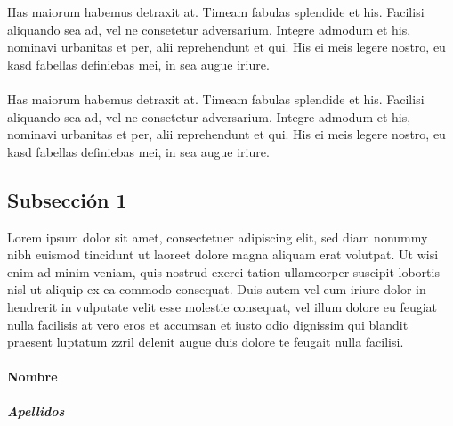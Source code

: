 \documentclass[11pt, letterpaper]{book} %
\begin{document}
\begin{comment}
Lorem ipsum dolor sit amet, consectetuer adipiscing elit, sed diam nonummy nibh euismod tincidunt ut laoreet dolore magna aliquam erat volutpat. Ut wisi enim ad minim veniam, quis nostrud exerci tation ullamcorper suscipit lobortis nisl ut aliquip ex ea commodo consequat. Duis autem vel eum iriure dolor in hendrerit in vulputate velit esse molestie consequat, vel illum dolore eu feugiat nulla facilisis at vero eros et accumsan et iusto odio dignissim qui blandit praesent luptatum zzril delenit augue duis dolore te feugait nulla facilisi.
\end{comment}

Has maiorum habemus detraxit at. Timeam fabulas splendide et his. Facilisi aliquando sea ad, vel ne consetetur adversarium. Integre admodum et his, nominavi urbanitas et per, alii reprehendunt et qui. His ei meis legere nostro, eu kasd fabellas definiebas mei, in sea augue iriure. \\\\
Has maiorum habemus detraxit at. Timeam fabulas splendide et his. Facilisi aliquando sea ad, vel ne consetetur adversarium. Integre admodum et his, nominavi urbanitas et per, alii reprehendunt et qui. His ei meis legere nostro, eu kasd fabellas definiebas mei, in sea augue iriure.

\subsection{Subsección 1}

Lorem ipsum dolor sit amet, consectetuer adipiscing elit, sed diam nonummy nibh euismod tincidunt ut laoreet dolore magna aliquam erat volutpat. Ut wisi enim ad minim veniam, quis nostrud exerci tation ullamcorper suscipit lobortis nisl ut aliquip ex ea commodo consequat. Duis autem vel eum iriure dolor in hendrerit in vulputate velit esse molestie consequat, vel illum dolore eu feugiat nulla facilisis at vero eros et accumsan et iusto odio dignissim qui blandit praesent luptatum zzril delenit augue duis dolore te feugait nulla facilisi.

\paragraph{Nombre}
\subparagraph{Apellidos}
\end{document}

